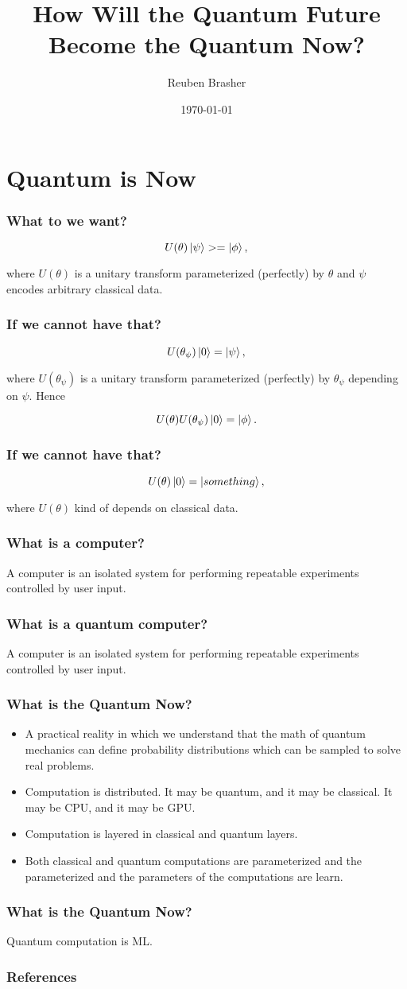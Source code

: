\documentclass{beamer}
\title{How Will the Quantum Future Become the Quantum Now?}
\author{Reuben Brasher}
\date{\today}
\begin{document}
\frame{\titlepage}

\section[Outline]{}
\frame{\tableofcontents}

\section{Quantum is Now}

\frame
{
   \frametitle{What to we want?}

   $$U(\theta) \ket{\psi} > = \ket{\phi},$$

   where $U(\theta)$ is a unitary transform parameterized (perfectly) by $\theta$ and $\psi$ encodes arbitrary classical
   data.
}

\frame
{
   \frametitle{If we cannot have that?}

   $$U(\theta_\psi) \ket{0} = \ket{\psi},$$

   where $U(\theta_\psi)$ is a unitary transform parameterized (perfectly) by $\theta_\psi$ depending on $\psi$. Hence

   $$U(\theta) U(\theta_\psi) \ket{0} = \ket{\phi}.$$
}

\frame
{
   \frametitle{If we cannot have that?}

   $$U(\theta) \ket{0} = \ket{something},$$

   where $U(\theta)$ kind of depends on classical data.
}

\frame
{
   \frametitle{What is a computer?}

   A computer is an isolated system for performing repeatable experiments controlled by user input.
}

\frame
{
   \frametitle{What is a quantum computer?}

   A computer is an isolated system for performing repeatable experiments controlled by user input.
}

\frame
{
   \frametitle{What is the Quantum Now?}

   \begin{itemize}
      \item<1-> A practical reality in which we understand that the math of quantum mechanics can define probability distributions
   which can be sampled to solve real problems.

      \item<2-> Computation is distributed. It may be quantum, and it may be classical. It may be CPU, and it may be
   GPU.

      \item<3-> Computation is layered in classical and quantum layers.

      \item<4-> Both classical and quantum computations are parameterized and the parameterized and the parameters of
   the computations are learn.

   \end{itemize}

}

\frame
{
   \frametitle{What is the Quantum Now?}

   Quantum computation is ML.
}

\begin{frame}[t,allowframebreaks]
\frametitle{References}
\printbibliography
\end{frame}
\end{document}

